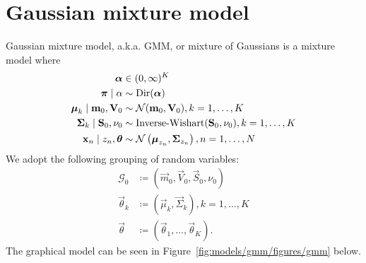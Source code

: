 \section{Gaussian mixture model}
Gaussian mixture model, a.k.a. GMM, or mixture of Gaussians is a mixture model where
\begin{align}
    \boldsymbol{\mathbf{\alpha}}                             &\in (0, \infty)^K \\
    \boldsymbol{\mathbf{\pi}} \mid \alpha                  &\sim \operatorname{Dir}(\boldsymbol{\mathbf{\alpha}}) \\
    \boldsymbol{\mathbf{\mu}}_k \mid \boldsymbol{\mathbf{m}}_0, \boldsymbol{\mathbf{V}}_0    &\sim \operatorname{\mathcal N}(\boldsymbol{\mathbf{m}}_0, \boldsymbol{\mathbf{V}}_0), k = 1, \dotsc, K \\
    \boldsymbol{\mathbf{\Sigma}}_k \mid \boldsymbol{\mathbf{S}}_0, \nu_0    &\sim \operatorname{Inverse-Wishart}(\boldsymbol{\mathbf{S}}_0, \nu_0), k = 1, \dotsc, K \\
    \boldsymbol{\mathbf{x}}_n \mid z_n, \boldsymbol{\mathbf{\theta}}        &\sim \operatorname{\mathcal N}\left(\boldsymbol{\mathbf{\mu}}_{z_n}, \boldsymbol{\mathbf{\Sigma}}_{z_n}\right), n = 1, \dotsc, N
\end{align}
We adopt the following grouping of random variables:
\begin{align}
    \mathcal G_0                            &\coloneqq \left(\vec m_0, \vec V_0, \vec S_0, \nu_0\right) \\
    \vec \theta_k                           &\coloneqq \left(\vec \mu_k, \vec \Sigma_k\right), k = 1, \dotsc, K \\
    \vec \theta                             &\coloneqq (\vec \theta_1, \dotsc, \vec \theta_K).
\end{align}
The graphical model can be seen in Figure~\ref{fig:models/gmm/figures/gmm} below.
